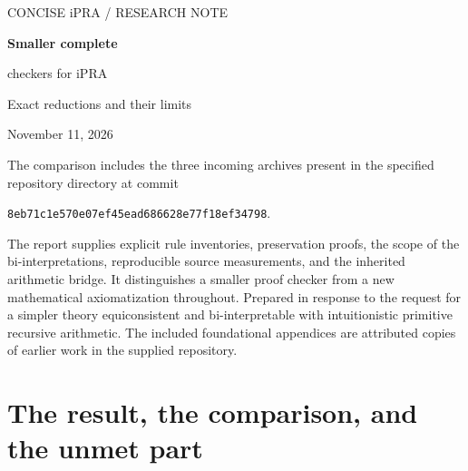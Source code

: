 \documentclass[11pt,letterpaper]{article}
\theoremstyle{definition}\newtheorem{definition}[theorem]{Definition}
\theoremstyle{remark}\newtheorem{remark}[theorem]{Remark}
\begin{document}
\hypersetup{pageanchor=false}
\begin{titlepage}
\vspace*{.65in}
{\small\sffamily\color{ink}CONCISE iPRA \quad / \quad RESEARCH NOTE}\par
\vspace{.3in}
{\Huge\bfseries\color{ink}Smaller complete\par checkers for iPRA}\par
\vspace{.2in}
{\Large Exact reductions and their limits}\par
\vspace{.35in}
{\large November 11, 2026}\par
\vspace{.35in}
\noindent{}
\vspace{.35in}
The comparison includes the three incoming archives present in the
specified repository directory at commit
\begin{center}\small\texttt{8eb71c1e570e07ef45ead686628e77f18ef34798}.\end{center}
The report supplies explicit rule inventories, preservation proofs,
the scope of the bi-interpretations, reproducible source measurements,
and the inherited arithmetic bridge. It distinguishes a smaller proof
checker from a new mathematical axiomatization throughout.
\vfill
{\small Prepared in response to the request for a simpler theory
equiconsistent and bi-interpretable with intuitionistic primitive
recursive arithmetic. The included foundational appendices are
attributed copies of earlier work in the supplied repository.}
\end{titlepage}
\hypersetup{pageanchor=true}
\tableofcontents
\clearpage
{}

\section{The result, the comparison, and the unmet part}
\label{sec:result}
\end{document}

